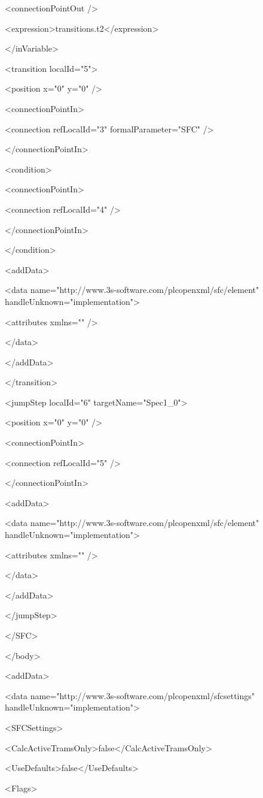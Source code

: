   <connectionPointOut />

  <expression>transitions.t2</expression>

 </inVariable>

 <transition localId="5">

  <position x="0" y="0" />

  <connectionPointIn>

   <connection refLocalId="3" formalParameter="SFC" />

  </connectionPointIn>

  <condition>

   <connectionPointIn>

    <connection refLocalId="4" />

   </connectionPointIn>

  </condition>

  <addData>

   <data name="http://www.3s-software.com/plcopenxml/sfc/element" handleUnknown="implementation">

    <attributes xmlns="" />

   </data>

  </addData>

 </transition>

 <jumpStep localId="6" targetName="Spec1\_0">

  <position x="0" y="0" />

  <connectionPointIn>

   <connection refLocalId="5" />

  </connectionPointIn>

  <addData>

   <data name="http://www.3s-software.com/plcopenxml/sfc/element" handleUnknown="implementation">

    <attributes xmlns="" />

   </data>

  </addData>

 </jumpStep>

</SFC>

</body>

<addData>

<data name="http://www.3s-software.com/plcopenxml/sfcsettings" handleUnknown="implementation">

 <SFCSettings>

  <CalcActiveTramsOnly>false</CalcActiveTramsOnly>

  <UseDefaults>false</UseDefaults>

  <Flags>

